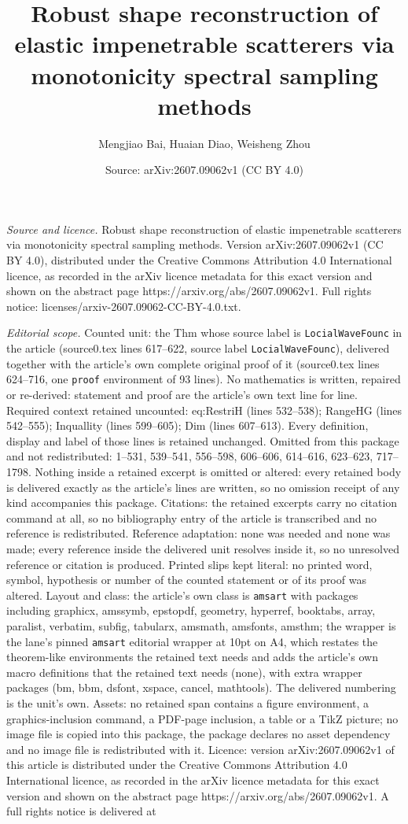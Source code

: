 \documentclass[10pt,a4paper]{amsart}
\title[Robust shape reconstruction of elastic impenetrable scattere]{Robust shape reconstruction of elastic impenetrable scatterers via monotonicity spectral sampling methods}
\author{Mengjiao Bai, Huaian Diao, Weisheng Zhou}
\date{Source: arXiv:2607.09062v1 (CC BY 4.0)}
\begin{document}
\maketitle

\noindent\emph{Source and licence.} Robust shape reconstruction of elastic impenetrable scatterers via monotonicity spectral sampling methods. Version arXiv:2607.09062v1 (CC BY 4.0), distributed under the Creative Commons Attribution 4.0 International licence, as recorded in the arXiv licence metadata for this exact version and shown on the abstract page https://arxiv.org/abs/2607.09062v1. Full rights notice: licenses/arxiv-2607.09062-CC-BY-4.0.txt.\par\smallskip

\noindent\textit{Editorial scope.} Counted unit: the Thm whose source label is \texttt{LocialWaveFounc} in the article (source0.tex lines 617--622, source label \texttt{LocialWaveFounc}), delivered together with the article's own complete original proof of it (source0.tex lines 624--716, one \texttt{proof} environment of 93 lines). No mathematics is written, repaired or re-derived: statement and proof are the article's own text line for line. Required context retained uncounted: eq:RestriH (lines 532--538); RangeHG (lines 542--555); Inquallity (lines 599--605); Dim (lines 607--613). Every definition, display and label of those lines is retained unchanged. Omitted from this package and not redistributed: 1--531, 539--541, 556--598, 606--606, 614--616, 623--623, 717--1798. Nothing inside a retained excerpt is omitted or altered: every retained body is delivered exactly as the article's lines are written, so no omission receipt of any kind accompanies this package. Citations: the retained excerpts carry no citation command at all, so no bibliography entry of the article is transcribed and no reference is redistributed. Reference adaptation: none was needed and none was made; every reference inside the delivered unit resolves inside it, so no unresolved reference or citation is produced. Printed slips kept literal: no printed word, symbol, hypothesis or number of the counted statement or of its proof was altered. Layout and class: the article's own class is \texttt{amsart} with packages including graphicx, amssymb, epstopdf, geometry, hyperref, booktabs, array, paralist, verbatim, subfig, tabularx, amsmath, amsfonts, amsthm; the wrapper is the lane's pinned \texttt{amsart} editorial wrapper at 10pt on A4, which restates the theorem-like environments the retained text needs and adds the article's own macro definitions that the retained text needs (none), with extra wrapper packages (bm, bbm, dsfont, xspace, cancel, mathtools). The delivered numbering is the unit's own. Assets: no retained span contains a figure environment, a graphics-inclusion command, a PDF-page inclusion, a table or a TikZ picture; no image file is copied into this package, the package declares no asset dependency and no image file is redistributed with it. Licence: version arXiv:2607.09062v1 of this article is distributed under the Creative Commons Attribution 4.0 International licence, as recorded in the arXiv licence metadata for this exact version and shown on the abstract page https://arxiv.org/abs/2607.09062v1. A full rights notice is delivered at 
\end{document}
